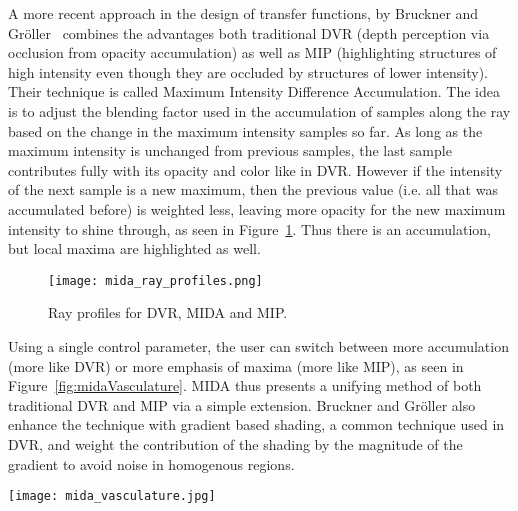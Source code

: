 A more recent approach in the design of transfer functions, by Bruckner and Gr{\"o}ller~\cite{bruckner2009instant} combines the advantages both traditional DVR (depth perception via occlusion from opacity accumulation) as well as MIP (highlighting structures of high intensity even though they are occluded by structures of lower intensity). Their technique is called Maximum Intensity Difference Accumulation. The idea is to adjust the blending factor used in the accumulation of samples along the ray based on the change in the maximum intensity samples so far. As long as the maximum intensity is unchanged from previous samples, the last sample contributes fully with its opacity and color like in DVR. However if the intensity of the next sample is a new maximum, then the previous value (i.e. all that was accumulated before) is weighted less, leaving more opacity for the new maximum intensity to shine through, as seen in Figure~\ref{fig:midaRayProfiles}. Thus there is an accumulation, but local maxima are highlighted as well. 
\begin{figure}[htb]
  \centering
  \texttt{[image: mida\_ray\_profiles.png]}
  \caption{\label{fig:midaRayProfiles} Ray profiles for DVR, MIDA and MIP.}
  \cite{bruckner2009instant}
\end{figure}
Using a single control parameter, the user can switch between more accumulation (more like DVR) or more emphasis of maxima (more like MIP), as seen in Figure~\ref{fig:midaVasculature}. MIDA thus presents a unifying method of both traditional DVR and MIP via a simple extension.
Bruckner and Gr{\"o}ller also enhance the technique with gradient based shading, a common technique used in DVR, and weight the contribution of the shading by the magnitude of the gradient to avoid noise in homogenous regions.

\begin{figure*}[htb]
  \centering
  \texttt{[image: mida\_vasculature.jpg]}
  \caption{\label{fig:midaVasculature} Maximum Intensity Difference Accumulation provides a technique that unifies both traditional DVR and MIP. Using a single control parameter, the user can switch between more accumulation (more like DVR) or more emphasis of maxima (more like MIP).}
  \cite{bruckner2009instant}
\end{figure*}


